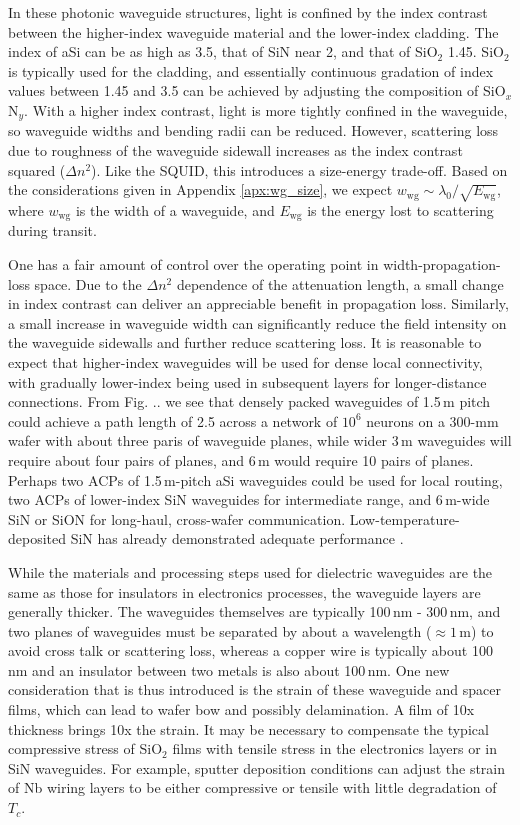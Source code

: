 \documentclass[twocolumn]{article}
\begin{document}
In these photonic waveguide structures, light is confined by the index contrast between the higher-index waveguide material and the lower-index cladding. The index of aSi can be as high as 3.5, that of SiN near 2, and that of SiO$_2$ 1.45. SiO$_2$ is typically used for the cladding, and essentially continuous gradation of index values between 1.45 and 3.5 can be achieved by adjusting the composition of SiO$_x$N$_y$. With a higher index contrast, light is more tightly confined in the waveguide, so waveguide widths and bending radii can be reduced. However, scattering loss due to roughness of the waveguide sidewall increases as the index contrast squared \cite{} ($\Delta n^2$). Like the SQUID, this introduces a size-energy trade-off. Based on the considerations given in Appendix \ref{apx:wg_size}, we expect $w_{\mathrm{wg}} \sim \lambda_0/\sqrt{E_{\mathrm{wg}}}$, where $w_{\mathrm{wg}}$ is the width of a waveguide, and $E_{\mathrm{wg}}$ is the energy lost to scattering during transit. 

One has a fair amount of control over the operating point in width-propagation-loss space. Due to the $\Delta n^2$ dependence of the attenuation length, a small change in index contrast can deliver an appreciable benefit in propagation loss. Similarly, a small increase in waveguide width can significantly reduce the field intensity on the waveguide sidewalls and further reduce scattering loss. It is reasonable to expect that higher-index waveguides will be used for dense local connectivity, with gradually lower-index being used in subsequent layers for longer-distance connections. From Fig. .. we see that densely packed waveguides of 1.5\,\textmu m pitch could achieve a path length of 2.5 across a network of $10^6$ neurons on a 300-mm wafer with about three paris of waveguide planes, while wider 3\,\textmu m waveguides will require about four pairs of planes, and 6\,\textmu m would require 10 pairs of planes. Perhaps two ACPs of 1.5\,\textmu m-pitch aSi waveguides could be used for local routing, two ACPs of lower-index SiN waveguides for intermediate range, and 6\,\textmu m-wide SiN or SiON for long-haul, cross-wafer communication. Low-temperature-deposited SiN has already demonstrated adequate performance \cite{}.

While the materials and processing steps used for dielectric waveguides are the same as those for insulators in electronics processes, the waveguide layers are generally thicker. The waveguides themselves are typically 100\,nm - 300\,nm, and two planes of waveguides must be separated by about a wavelength ($\approx 1$\,\textmu m) to avoid cross talk or scattering loss, whereas a copper wire is typically about 100\,nm and an insulator between two metals is also about 100\,nm. One new consideration that is thus introduced is the strain of these waveguide and spacer films, which can lead to wafer bow and possibly delamination. A film of 10x thickness brings 10x the strain. It may be necessary to compensate the typical compressive stress of SiO$_2$ films with tensile stress in the electronics layers or in SiN waveguides. For example, sputter deposition conditions can adjust the strain of Nb wiring layers to be either compressive or tensile with little degradation of $T_c$.
\end{document}
